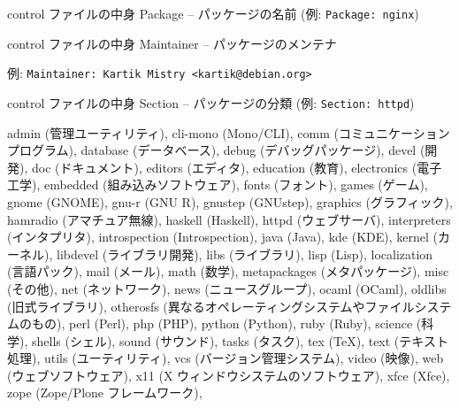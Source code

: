  \begin{frame}[containsverbatim]{control ファイルの中身}
  Package -- パッケージの名前 (例: \verb+Package: nginx+)
 \end{frame}

 \begin{frame}[containsverbatim]{control ファイルの中身}
  Maintainer -- パッケージのメンテナ

  例: \verb+Maintainer: Kartik Mistry <kartik@debian.org>+
 \end{frame}

 \begin{frame}[containsverbatim]{control ファイルの中身}
  Section -- パッケージの分類 (例: \verb+Section: httpd+)

  {\scriptsize{
admin         (管理ユーティリティ),					    
cli-mono      (Mono/CLI),						    
comm	      (コミュニケーションプログラム),				    
database      (データベース),						    
debug	      (デバッグパッケージ),					    
devel	      (開発),							    
doc	      (ドキュメント),						    
editors	      (エディタ),						    
education     (教育),							    
electronics   (電子工学),						    
embedded      (組み込みソフトウェア),					    
fonts	      (フォント),						    
games	      (ゲーム),						    
gnome	      (GNOME),						    
gnu-r	      (GNU R),						    
gnustep	      (GNUstep),						    
graphics      (グラフィック),						    
hamradio      (アマチュア無線),					    
haskell	      (Haskell),						    
httpd	      (ウェブサーバ),						    
interpreters  (インタプリタ),						    
introspection (Introspection),					    
java	      (Java),							    
kde	      (KDE),							    
kernel	      (カーネル),						    
libdevel      (ライブラリ開発),					    
libs	      (ライブラリ),						    
lisp	      (Lisp),							    
localization  (言語パック),						    
mail	      (メール),						    
math	      (数学),							    
metapackages  (メタパッケージ),					    
misc	      (その他),						    
net	      (ネットワーク),						    
news	      (ニュースグループ),					    
ocaml	      (OCaml),						    
oldlibs	      (旧式ライブラリ),					    
otherosfs     (異なるオペレーティングシステムやファイルシステムのもの),   
perl	      (Perl),							    
php	      (PHP),							    
python	      (Python),						    
ruby	      (Ruby),							    
science	      (科学),							    
shells	      (シェル),						    
sound	      (サウンド),						    
tasks	      (タスク),						    
tex	      (\TeX),							    
text	      (テキスト処理),						    
utils	      (ユーティリティ),					    
vcs	      (バージョン管理システム),				    
video	      (映像),							    
web	      (ウェブソフトウェア),					    
x11	      (X ウィンドウシステムのソフトウェア),			    
xfce	      (Xfce),							    
zope	      (Zope/Plone フレームワーク),				    
}}
 \end{frame}

